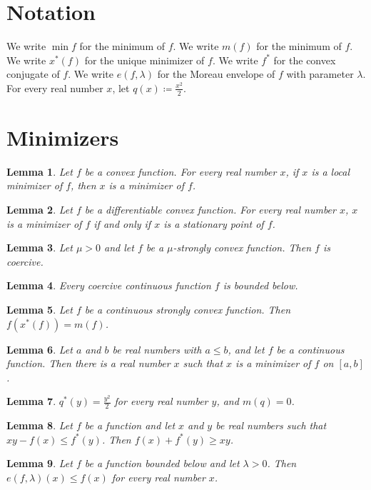 \documentclass{article}
\newtheorem{lemma}{Lemma}
\begin{document}
\section{Notation}

We write $\min f$ for the minimum of $f$.
We write $m(f)$ for the minimum of $f$.
We write $x^*(f)$ for the unique minimizer of $f$.
We write $f^*$ for the convex conjugate of $f$.
We write $e(f,\lambda)$ for the Moreau envelope of $f$ with parameter $\lambda$.
For every real number $x$, let $q(x)\coloneqq\frac{x^2}{2}$.

\section{Minimizers}

\begin{lemma}\label{local}
Let $f$ be a convex function. For every real number $x$, if $x$ is a local minimizer of $f$, then $x$ is a minimizer of $f$.
\end{lemma}

\begin{lemma}\label{stationary}
Let $f$ be a differentiable convex function. For every real number $x$, $x$ is a minimizer of $f$ if and only if $x$ is a stationary point of $f$.
\end{lemma}

\begin{lemma}\label{strong}
Let $\mu>0$ and let $f$ be a $\mu$-strongly convex function. Then $f$ is coercive.
\end{lemma}

\begin{lemma}\label{coercive}
Every coercive continuous function $f$ is bounded below.
\end{lemma}

\begin{lemma}\label{unique}
Let $f$ be a continuous strongly convex function. Then $f(x^*(f))=m(f)$.
\end{lemma}

\begin{lemma}\label{interval}
Let $a$ and $b$ be real numbers with $a\le b$, and let $f$ be a continuous function. Then there is a real number $x$ such that $x$ is a minimizer of $f$ on $[a,b]$.
\end{lemma}

\begin{lemma}\label{square}
$q^*(y)=\frac{y^2}{2}$ for every real number $y$, and $m(q)=0$.
\end{lemma}

\begin{lemma}\label{fenchel}
Let $f$ be a function and let $x$ and $y$ be real numbers such that $xy-f(x)\le f^*(y)$. Then $f(x)+f^*(y)\ge xy$.
\end{lemma}

\begin{lemma}\label{envelope}
Let $f$ be a function bounded below and let $\lambda>0$. Then $e(f,\lambda)(x)\le f(x)$ for every real number $x$.
\end{lemma}
\end{document}
